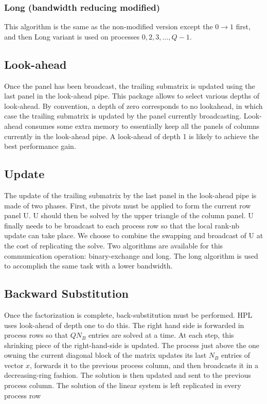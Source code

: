 \documentclass[a4paper, 11pt]{article}
\begin{document}
\subsubsection{Long (bandwidth reducing modified)}
This algorithm is the same as the non-modified version except the $0 \rightarrow 1$ first, and then Long variant is used on processes $0,2,3,\dots,Q-1$.

\subsection{Look-ahead}
Once the panel has been broadcast, the trailing submatrix is updated using the last panel in the look-ahead pipe. This package allows to select various depths of look-ahead. By convention, a depth of zero corresponds to no lookahead, in which case the trailing submatrix is updated by the panel currently broadcasting. Look-ahead consumes some extra memory to essentially keep all the panels of columns currently in the look-ahead pipe. A look-ahead of depth 1 is likely to achieve the best performance gain.

\subsection{Update}
The update of the trailing submatrix by the last panel in the look-ahead pipe is made of two phases. First, the pivots must be applied to form the current row panel U. U should then be solved by the upper triangle of the column panel. U finally needs to be broadcast to each process row so that the local rank-nb update can take place. We choose to combine the swapping and broadcast of U at the cost of replicating the solve. Two algorithms are available for this communication operation: binary-exchange and long. The long algorithm is used to accomplish the same task with a lower bandwidth.

\subsection{Backward Substitution}
Once the factorization is complete, back-substitution must be performed. HPL uses look-ahead of depth one
to do this. The right hand side is forwarded in process rows so that $QN_{B}$ entries are solved at a time. At each step, this shrinking piece of the right-hand-side is updated. The process just above the one owning the current diagonal block of the matrix updates its last $N_{B}$ entries of vector $x$, forwards it to the previous process column, and then broadcasts it  in a decreasing-ring fashion. The solution is then updated and sent to the previous process column. The solution of the linear system is left replicated in every process row
\end{document}
